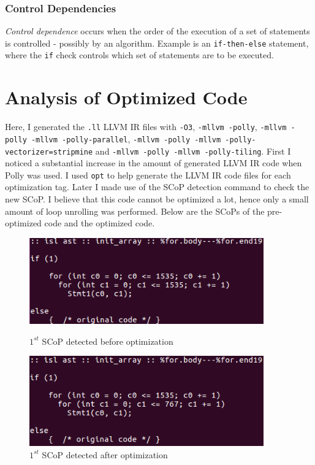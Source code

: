 \documentclass{article}
\begin{document}
\begin{flushleft}
\subsubsection*{Control Dependencies}
\textit{Control dependence} occurs when the order of the execution of a set of statements is controlled - possibly by an algorithm. Example is an \texttt{if-then-else} statement, where the \texttt{if} check controls which set of statements are to be executed. 
\end{flushleft}

\section{Analysis of Optimized Code}
Here, I generated the \texttt{.ll} LLVM IR files with \texttt{-O3}, \texttt{-mllvm -polly}, \texttt{-mllvm -polly -mllvm -polly-parallel}, \texttt{-mllvm -polly -mllvm -polly-vectorizer=stripmine} and \texttt{-mllvm -polly -mllvm -polly-tiling}. First I noticed a substantial increase in the amount of generated LLVM IR code when Polly was used. I used \texttt{opt} to help generate the LLVM IR code files for each optimization tag. Later I made use of the SCoP detection command to check the new SCoP. I believe that this code cannot be optimized a lot, hence only a small amount of loop unrolling was performed. Below are the SCoPs of the pre-optimized code and the optimized code.

\begin{figure}[H]
\begin{minipage}{0.45\linewidth}
\includegraphics[width=0.9\textwidth]{./images/SCoP-1-before.png}
\caption{\(1^{st}\) SCoP detected before optimization}
\end{minipage}
\hfill
\begin{minipage}{0.45\linewidth}
\includegraphics[width=0.9\textwidth]{./images/SCoP-1-after.png}
\caption{\(1^{st}\) SCoP detected after optimization}
\end{minipage}
\end{figure}
\end{document}
